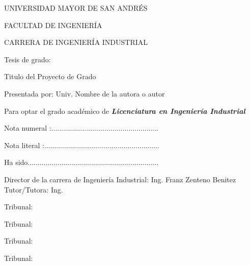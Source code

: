 	\begin{center}
			{\Large UNIVERSIDAD MAYOR DE SAN ANDRÉS}
		
			{\large FACULTAD DE INGENIERÍA}
		
			{\large CARRERA DE INGENIERÍA INDUSTRIAL}
	\end{center}
		Tesis de grado:
	\begin{center}
			{\Large Titulo del Proyecto de Grado}
	\end{center}
		Presentada por: Univ. Nombre de la autora o autor
		
		Para optar el grado académico de \textbf{\textit{Licenciatura en Ingeniería Industrial}}
		
		Nota numeral :......................................................
		
		Nota literal :..........................................................
		
		Ha sido..................................................................
		
		
		Director de la carrera de Ingeniería Industrial: Ing. Franz Zenteno Benitez
		Tutor/Tutora: Ing.
		
		Tribunal: 
		
		Tribunal:
		
		Tribunal:
		
		Tribunal: